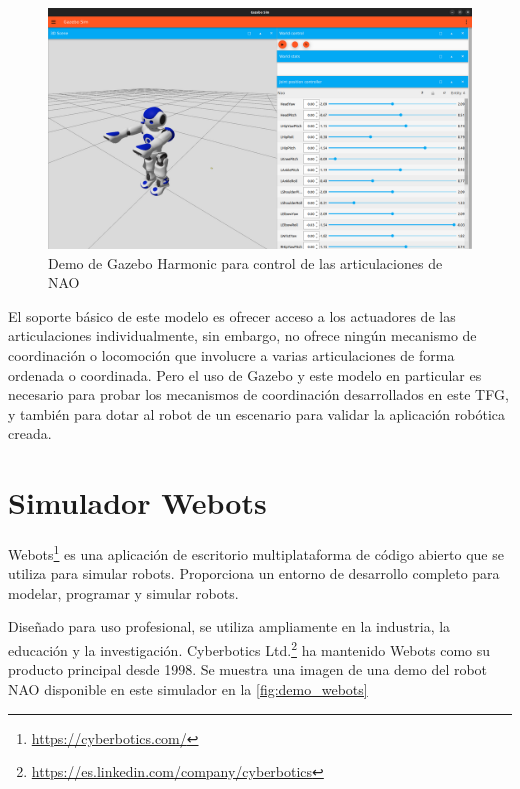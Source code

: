 \begin{figure}[H]
    \centering
    \includegraphics[width=1\textwidth]{figures/cap_3/demo_nao.png}
    \caption{Demo de Gazebo Harmonic para control de las articulaciones de NAO}
    \label{fig:demo_gazebo}
\end{figure}

El soporte básico de este modelo es ofrecer acceso a los actuadores de las articulaciones individualmente, sin embargo, no ofrece ningún mecanismo de coordinación o locomoción  que involucre a varias articulaciones de forma ordenada o coordinada. Pero el uso de Gazebo y este modelo en particular es necesario para probar los mecanismos de coordinación desarrollados en este TFG, y también para dotar al robot de un escenario para validar la aplicación robótica creada.

\section{Simulador Webots}

Webots\footnote{\url{https://cyberbotics.com/}} es una aplicación de escritorio multiplataforma de código abierto que se utiliza para simular robots. Proporciona un entorno de desarrollo completo para modelar, programar y simular robots.

Diseñado para uso profesional, se utiliza ampliamente en la industria, la educación y la investigación. Cyberbotics Ltd.\footnote{\url{https://es.linkedin.com/company/cyberbotics}} ha mantenido Webots como su producto principal desde 1998. Se muestra una imagen de una demo del robot NAO disponible en este simulador en la \autoref{fig:demo_webots}

